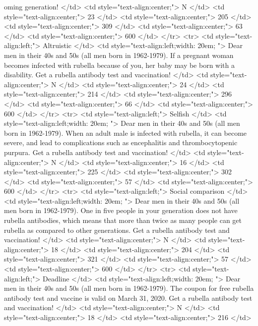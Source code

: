 oming generation! </td>
   <td style="text-align:center;"> N </td>
   <td style="text-align:center;"> 23 </td>
   <td style="text-align:center;"> 205 </td>
   <td style="text-align:center;"> 309 </td>
   <td style="text-align:center;"> 63 </td>
   <td style="text-align:center;"> 600 </td>
  </tr>
  <tr>
   <td style="text-align:left;"> Altruistic </td>
   <td style="text-align:left;width: 20em; "> Dear men in their 40s and 50s (all men born in 1962-1979). If a pregnant woman becomes infected with rubella because of you, her baby may be born with a disability. Get a rubella antibody test and vaccination! </td>
   <td style="text-align:center;"> N </td>
   <td style="text-align:center;"> 24 </td>
   <td style="text-align:center;"> 214 </td>
   <td style="text-align:center;"> 296 </td>
   <td style="text-align:center;"> 66 </td>
   <td style="text-align:center;"> 600 </td>
  </tr>
  <tr>
   <td style="text-align:left;"> Selfish </td>
   <td style="text-align:left;width: 20em; "> Dear men in their 40s and 50s (all men born in 1962-1979). When an adult male is infected with rubella, it can become severe, and lead to complications such as encephalitis and thrombocytopenic purpura. Get a rubella antibody test and vaccination! </td>
   <td style="text-align:center;"> N </td>
   <td style="text-align:center;"> 16 </td>
   <td style="text-align:center;"> 225 </td>
   <td style="text-align:center;"> 302 </td>
   <td style="text-align:center;"> 57 </td>
   <td style="text-align:center;"> 600 </td>
  </tr>
  <tr>
   <td style="text-align:left;"> Social comparison </td>
   <td style="text-align:left;width: 20em; "> Dear men in their 40s and 50s (all men born in 1962-1979). One in five people in your generation does not have rubella antibodies, which means that more than twice as many people can get rubella as compared to other generations. Get a rubella antibody test and vaccination! </td>
   <td style="text-align:center;"> N </td>
   <td style="text-align:center;"> 18 </td>
   <td style="text-align:center;"> 204 </td>
   <td style="text-align:center;"> 321 </td>
   <td style="text-align:center;"> 57 </td>
   <td style="text-align:center;"> 600 </td>
  </tr>
  <tr>
   <td style="text-align:left;"> Deadline </td>
   <td style="text-align:left;width: 20em; "> Dear men in their 40s and 50s (all men born in 1962-1979). The coupon for free rubella antibody test and vaccine is valid on March 31, 2020. Get a rubella antibody test and vaccination! </td>
   <td style="text-align:center;"> N </td>
   <td style="text-align:center;"> 18 </td>
   <td style="text-align:center;"> 216 </td>
